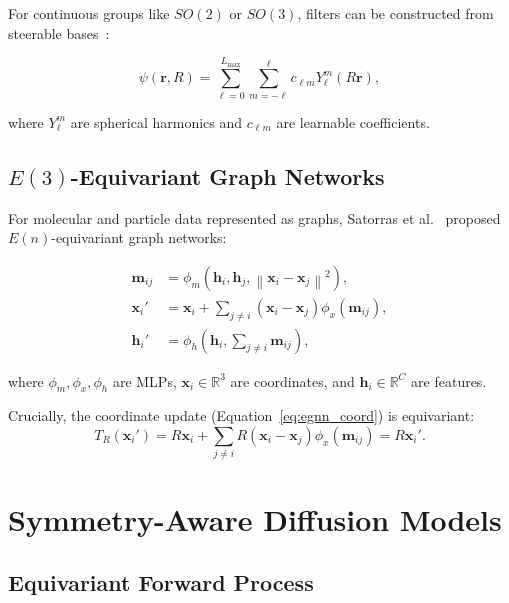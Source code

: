 \documentclass[12pt]{report}
\theoremstyle{definition}
\newcommand{\R}{\mathbb{R}}
\newcommand{\norm}[1]{\left\| #1 \right\|}
\begin{document}
For continuous groups like $SO(2)$ or $SO(3)$, filters can be constructed from steerable bases~\citep{weiler2018learning}:

\begin{equation}
\psi(\mathbf{r}, R) = \sum_{\ell=0}^{L_{\max}} \sum_{m=-\ell}^\ell c_{\ell m} Y_\ell^m(R\mathbf{r}),
\label{eq:steerable_filter}
\end{equation}

where $Y_\ell^m$ are spherical harmonics and $c_{\ell m}$ are learnable coefficients.

\subsection{$E(3)$-Equivariant Graph Networks}

For molecular and particle data represented as graphs, Satorras et al.~\citep{satorras2021n} proposed $E(n)$-equivariant graph networks:

\begin{align}
\mathbf{m}_{ij} &= \phi_m(\mathbf{h}_i, \mathbf{h}_j, \norm{\mathbf{x}_i - \mathbf{x}_j}^2), \label{eq:egnn_message} \\
\mathbf{x}_i' &= \mathbf{x}_i + \sum_{j \neq i} (\mathbf{x}_i - \mathbf{x}_j) \phi_x(\mathbf{m}_{ij}), \label{eq:egnn_coord} \\
\mathbf{h}_i' &= \phi_h(\mathbf{h}_i, \sum_{j \neq i} \mathbf{m}_{ij}), \label{eq:egnn_feature}
\end{align}

where $\phi_m, \phi_x, \phi_h$ are MLPs, $\mathbf{x}_i \in \R^3$ are coordinates, and $\mathbf{h}_i \in \R^{C}$ are features.

Crucially, the coordinate update (Equation~\ref{eq:egnn_coord}) is equivariant:
\begin{equation}
T_R(\mathbf{x}_i') = R\mathbf{x}_i + \sum_{j \neq i} R(\mathbf{x}_i - \mathbf{x}_j) \phi_x(\mathbf{m}_{ij}) = R\mathbf{x}_i'.
\label{eq:egnn_equivariance_proof}
\end{equation}

\section{Symmetry-Aware Diffusion Models}

\subsection{Equivariant Forward Process}
\end{document}
